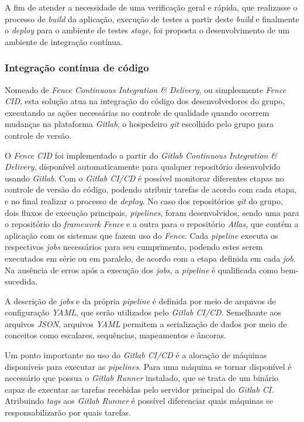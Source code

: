 A fim de atender a necessidade de uma verificação geral e rápida, que realizasse o processo de \emph{build} da aplicação, execução de testes a partir deste \emph{build} e finalmente o \emph{deploy} para o ambiente de testes \emph{stage}, foi proposta o desenvolvimento de um ambiente de integração contínua.

\hypertarget{integracao-continua-de-código}{%
\subsubsection{Integração contínua de código}\label{integracao-continua-de-código}}

Nomeado de \emph{Fence Continuous Integration \& Delivery}, ou simplesmente \emph{Fence CID}, esta solução atua na integração do código dos desenvolvedores do grupo, executando as ações necessárias no controle de qualidade quando ocorrem mudanças na plataforma \emph{Gitlab}, o hospedeiro \emph{git} escolhido pelo grupo para controle de versão.

O \emph{Fence CID} foi implementado a partir do \emph{Gitlab Continuous Integration \& Delivery}, disponível automaticamente para qualquer repositório desenvolvido usando \emph{Gitlab}. Com o \emph{Gitlab CI/CD} é possível monitorar diferentes etapas no controle de versão do código, podendo atribuir tarefas de acordo com cada etapa, e no final realizar o processo de \emph{deploy}. No caso dos repositórios \emph{git} do grupo, dois fluxos de execução principais, \emph{pipelines}, foram desenvolvidos, sendo uma para o repositório do \emph{framework} \emph{Fence} e a outra para o repositório \emph{Atlas}, que contém a aplicação com os sistemas que fazem uso do \emph{Fence}. Cada \emph{pipeline} executa os respectivos \emph{jobs} necessários para seu cumprimento, podendo estes serem executados em série ou em paralelo, de acordo com a etapa definida em cada \emph{job}. Na ausência de erros após a execução dos \emph{jobs}, a \emph{pipeline} é qualificada como bem-sucedida.

A descrição de \emph{jobs} e da própria \emph{pipeline} é definida por meio de arquivos de configuração \emph{YAML}, que serão utilizados pelo \emph{Gitlab CI/CD}. Semelhante aos arquivos \emph{JSON}, arquivos \emph{YAML} permitem a serialização de dados por meio de conceitos como escalares, sequências, mapeamentos e âncoras.

Um ponto importante no uso do \emph{Gitlab CI/CD} é a alocação de máquinas disponíveis para executar as \emph{pipelines}. Para uma máquina se tornar disponível é necessário que possua o \emph{Gitlab Runner} instalado, que se trata de um binário capaz de executar as tarefas recebidas pelo servidor principal do \emph{Gitlab CI}. Atribuindo \emph{tags} aos \emph{Gitlab Runner} é possível diferenciar quais máquinas se responsabilizarão por quais tarefas.

